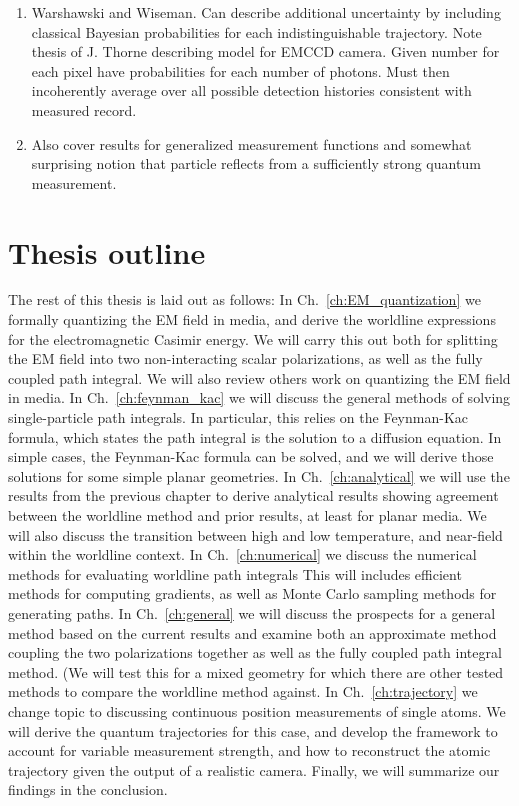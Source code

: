 \begin{enumerate}
\item Warshawski and Wiseman.
  Can describe additional uncertainty by including classical Bayesian probabilities for each indistinguishable trajectory.
  Note thesis of J. Thorne describing model for EMCCD camera.
  Given number for each pixel have probabilities for each number of photons.
  Must then incoherently average over all possible detection histories consistent with measured record.
  \cite{Warszawski2002,Warszawski2003a,Warszawski2003b}
\item Also cover results for generalized measurement functions and 
somewhat surprising notion that particle reflects from a sufficiently
strong quantum measurement.
\end{enumerate}

\section{Thesis outline}

The rest of this thesis is laid out as follows:  In Ch.~\ref{ch:EM_quantization} we formally quantizing
the EM field in media, and derive the worldline expressions for the electromagnetic Casimir energy.
We will carry this out both for splitting the EM field into two non-interacting scalar polarizations,
as well as the fully coupled path integral.
We will also review others work on quantizing the EM field in media.
In Ch.~\ref{ch:feynman_kac} we will discuss the general methods of solving single-particle path 
integrals.  In particular, this relies on the Feynman-Kac formula, which states the path integral
 is the solution to a diffusion equation.  In simple cases, the Feynman-Kac formula can be solved,
and we will derive those solutions for some simple planar geometries. 
In Ch.~\ref{ch:analytical} we will use the results from the previous chapter to derive analytical 
results showing agreement between the worldline method and prior results, at least for planar media.
We will also discuss the transition between high and low temperature, and near-field within the
worldline context.  
In Ch.~\ref{ch:numerical} we discuss the numerical methods for evaluating worldline path integrals
This will includes efficient methods for computing gradients, as well as Monte Carlo sampling methods
for generating paths. 
In Ch.~\ref{ch:general} we will discuss the prospects for a general method based on the current
results and examine both an approximate method coupling the two polarizations together as well
as the fully coupled path integral method.  (We will test this for a mixed geometry for which
there are other tested methods to compare the worldline method against. 
In Ch.~\ref{ch:trajectory} we change topic to discussing continuous position measurements 
of single atoms.  We will derive the quantum trajectories for this case, and develop the framework
to account for variable measurement strength, and how to reconstruct the atomic trajectory
given the output of a realistic camera.  
Finally, we will summarize our findings in the conclusion.  



